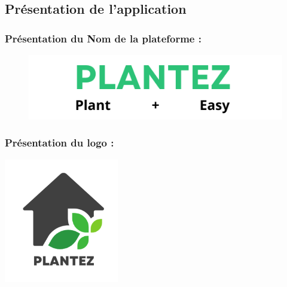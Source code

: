 \documentclass[a4paper,12pt,oneside]{article}
\begin{document}
{\newpage


\subsection{Présentation de l’application}
\subsubsection{Présentation du Nom de la plateforme :}
	\begin{figure}[h]
	\centering
	\includegraphics[width=12cm]{nom}
	\end{figure}
\subsubsection{Présentation du logo :}

		\begin{center}
  		\includegraphics[width=5cm]{LOGO last version}
		\end{center}
		
		\begin{center}
		\end{center}
		
}
\end{document}
